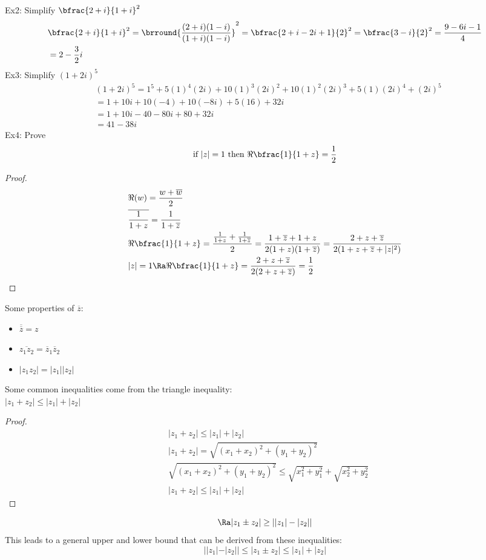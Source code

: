 Ex2: Simplify $\bfrac{2+i}{1+i}^2$
\begin{align*}
    &\bfrac{2+i}{1+i}^2=\brround{\frac{(2+i)(1-i)}{(1+i)(1-i)}}^2=\bfrac{2+i-2i+1}{2}^2=\bfrac{3-i}{2}^2=\frac{9-6i-1}{4}\\
    &=2-\frac{3}{2}i
\end{align*}
Ex3: Simplify $(1+2i)^5$
\begin{align*}
    &(1+2i)^5=1^5+5(1)^4(2i)+10(1)^3(2i)^2+10(1)^2(2i)^3+5(1)(2i)^4+(2i)^5\\
    &=1+10i+10(-4)+10(-8i)+5(16)+32i\\
    &=1+10i-40-80i+80+32i\\
    &=41-38i
\end{align*}
Ex4: Prove
\[ \text{if }|z|=1\text{ then }\Re\bfrac{1}{1+z}=\frac{1}{2} \]
\begin{proof}
\begin{align*}
    &\Re(w)=\frac{w+\overline{w}}{2}\\
    &\overline{\frac{1}{1+z}}=\frac{1}{1+\overline{z}}\\
    &\Re\bfrac{1}{1+z}=\frac{\frac{1}{1+z}+\frac{1}{1+\overline{z}}}{2}=\frac{1+\overline{z}+1+z}{2(1+z)(1+\overline{z})}=\frac{2+z+\overline{z}}{2(1+z+\overline{z}+|z|^2)}\\
    &|z|=1\Ra \Re\bfrac{1}{1+z}=\frac{2+z+\overline{z}}{2(2+z+\overline{z})}=\frac{1}{2}
\end{align*}
\end{proof}
Some properties of $\overline{z}$:
\begin{itemize}
    \item $\overline{\overline{z}}=z$
    \item $\overline{z_1z_2}=\overline{z}_1\overline{z}_2$
    \item $|z_1z_2|=|z_1||z_2|$
\end{itemize}
Some common inequalities come from the triangle inequality:\\
$|z_1+z_2|\leq |z_1|+|z_2|$
\begin{proof}
\begin{align*}
    &|z_1+z_2|\leq |z_1|+|z_2|\\
    &|z_1+z_2|=\sqrt{(x_1+x_2)^2+(y_1+y_2)^2}\\
    &\sqrt{(x_1+x_2)^2+(y_1+y_2)^2}\leq \sqrt{x_1^2+y_1^2}+\sqrt{x_2^2+y_2^2}\\
    &|z_1+z_2|\leq |z_1|+|z_2|
\end{align*}
\end{proof}
\[
\Ra |z_1\pm z_2|\geq ||z_1|-|z_2||
\]
This leads to a general upper and lower bound that can be derived from these inequalities:
$$||z_1|-|z_2||\leq|z_1\pm z_2|\leq |z_1|+|z_2|$$


